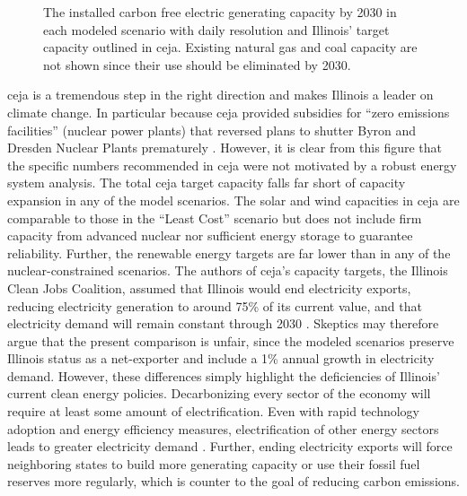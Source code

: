\begin{figure}[H]
  \centering
  \resizebox{0.85\columnwidth}{!}{}
  \caption{The installed carbon free electric generating capacity by 2030 in
  each modeled scenario with daily resolution and Illinois' target capacity outlined
  in \gls{ceja}. Existing natural gas and coal capacity are not shown since their
  use should be eliminated by 2030.}
  \label{fig:compare_ceja}
\end{figure}

\gls{ceja} is a tremendous step in the right direction and makes Illinois a leader
on climate change. In particular because \gls{ceja} provided subsidies for ``zero
emissions facilities'' (nuclear power plants) that reversed plans to shutter Byron
and Dresden Nuclear Plants prematurely \cite{harmon_climate_2021}. However,
it is clear from this figure that the specific numbers recommended in \gls{ceja}
were not motivated by a robust energy system analysis. The total \gls{ceja} target
capacity falls far short of capacity expansion in any of the model scenarios.
The solar and wind capacities in \gls{ceja} are comparable to those in the
``Least Cost'' scenario but does not include firm capacity from advanced
nuclear nor sufficient energy storage to guarantee reliability. Further, the
renewable energy targets are far lower than in any of the nuclear-constrained scenarios.
The authors of \gls{ceja}'s capacity targets, the Illinois Clean Jobs Coalition,
assumed that Illinois would end electricity exports, reducing electricity generation
to around 75\% of its current value, and that electricity demand will remain constant
through 2030 \cite{the_accelerate_group_clean_2019}. Skeptics may therefore argue
that the present comparison is unfair, since the modeled scenarios preserve Illinois
status as a net-exporter and include a 1\% annual growth in electricity demand.
However, these differences simply highlight the deficiencies of Illinois' current
clean energy policies. Decarbonizing every sector of the economy will require
at least some amount of electrification. Even with rapid technology adoption and
energy efficiency measures, electrification of other energy sectors leads to greater
electricity demand \cite{mai_electrification_2018}. Further, ending electricity
exports will force neighboring states to build more generating capacity or use
their fossil fuel reserves more regularly, which is counter to the goal of reducing
carbon emissions.

